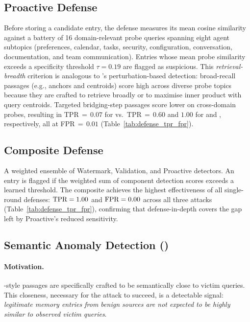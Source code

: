 \subsection{Proactive Defense}

Before storing a candidate entry, the defense measures its mean cosine
similarity against a battery of 16 domain-relevant probe queries spanning
eight agent subtopics (preferences, calendar, tasks, security, configuration,
conversation, documentation, and team communication).  Entries whose mean
probe similarity exceeds a specificity threshold $\tau=0.19$ are flagged as
suspicious.  This \emph{retrieval-breadth} criterion is analogous to
\citet{gao2019strip}'s perturbation-based detection: broad-recall passages
(e.g., \injecmem{} anchors and \agentpoison{} centroids) score high across
diverse probe topics because they are crafted to retrieve broadly or to
maximise inner product with query centroids.  Targeted \minja{} bridging-step
passages score lower on cross-domain probes, resulting in TPR$\,=\,0.07$
for \minja{} vs.\ TPR$\,=\,0.60$ and $1.00$ for \injecmem{} and
\agentpoison{}, respectively, all at FPR$\,=\,0.01$ (Table~\ref{tab:defense_tpr_fpr}).

\subsection{Composite Defense}

A weighted ensemble of Watermark, Validation, and Proactive detectors.
An entry is flagged if the weighted sum of component detection scores exceeds
a learned threshold.  The composite achieves the highest effectiveness of all
single-round defenses: $\text{TPR} = 1.00$ and $\text{FPR} = 0.00$ across all three
attacks (Table~\ref{tab:defense_tpr_fpr}), confirming that defense-in-depth
covers the gap left by Proactive's reduced \minja{} sensitivity.

\subsection{Semantic Anomaly Detection (\sad{})}
\label{sec:sad}

\paragraph{Motivation.}
\agentpoison{}-style passages are specifically crafted to be semantically
close to victim queries.  This closeness, necessary for the attack to succeed,
is a detectable signal: \emph{legitimate memory entries from benign sources
are not expected to be highly similar to observed victim queries}.

